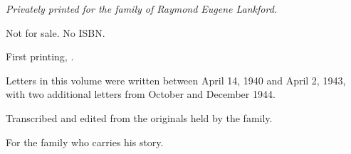 
\clearpage
\thispagestyle{laempty}
\vspace*{0.55\textheight}
\begin{center}
    {\small\itshape\color{walnutsoft}
        Privately printed for the family of Raymond Eugene Lankford.\par
        Not for sale. No ISBN.\par
        \vspace{1.4em}
        First printing, \the\year.\par
        \vspace{0.8em}
        Letters in this volume were written between April 14, 1940 and April 2, 1943,\\
        with two additional letters from October and December 1944.\par
        \vspace{1.4em}
        Transcribed and edited from the originals held by the family.\par
        \vspace{1.4em}
        For the family who carries his story.\par}
\end{center}
\vfill
